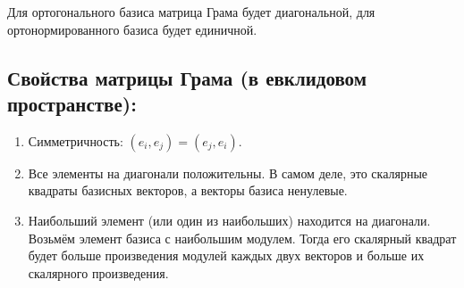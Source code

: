 \documentclass[12pt]{article}
\begin{document}
Для ортогонального базиса матрица Грама будет диагональной, для ортонормированного базиса будет единичной.

\subsection{Свойства матрицы Грама (в евклидовом пространстве):}
\begin{enumerate}
    \item Симметричность: $(e_i,e_j)=(e_j,e_i)$.
    \item Все элементы на диагонали положительны. В самом деле, это скалярные квадраты базисных векторов, а векторы базиса ненулевые.
    \item  Наибольший элемент (или один из наибольших) находится на диагонали.
          Возьмём элемент базиса с наибольшим модулем. Тогда его скалярный квадрат будет больше произведения
          модулей каждых двух векторов и больше их скалярного произведения.
\end{enumerate}
\end{document}
